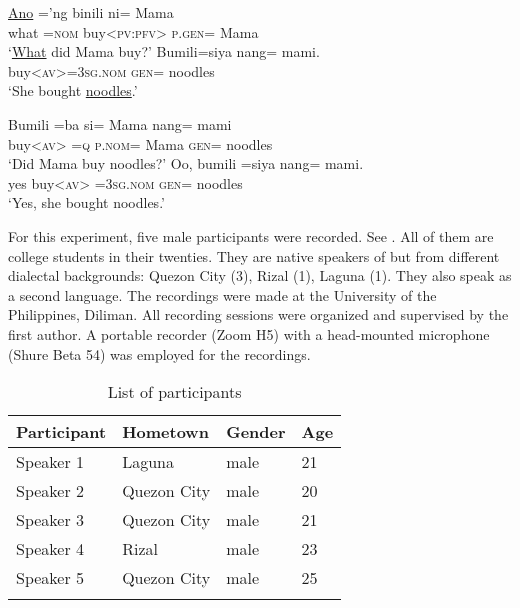 \documentclass[output=paper]{langsci/langscibook}
\begin{document}
\begin{exe}
	\ex\label{e:nagaya:13}
	\begin{xlist}
		\gll \uline{Ano}  =’ng  {\ob}b{\USSmaller}in{\USGreater}ili    ni=    Mama{\cb}{\USQMark}\\
		what  =\textsc{nom}  \phantom{[}buy<\textsc{pv:pfv}>  \textsc{p.gen}=  Mama\\
		\glt ‘\uline{What} did Mama buy?’
		\gll B{\USSmaller}um{\USGreater}ili=siya  nang=  mami\llap{\uline{\phantom{nang=  mami}}}.\\
		buy<\textsc{av}>=\textsc{3sg.nom}  \textsc{gen}=  noodles\\
		\glt ‘She bought \uline{noodles}.’
	\end{xlist}
\end{exe}

\begin{exe}
	\ex\label{e:nagaya:14}
	\begin{xlist}
		\exi{Q:}  
		\gll B{\USSmaller}um{\USGreater}ili  =ba  si=    Mama  nang=  mami{\USQMark}\\
		buy<\textsc{av}>  \textsc{=q}  \textsc{p.nom}=  Mama  \textsc{gen}=  noodles\\
		\glt ‘Did Mama buy noodles?’
		\exi{A:}
		\gll Oo,  b{\USSmaller}um{\USGreater}ili  =siya    nang=  mami.\\
		yes  buy<\textsc{av}>  =\textsc{3sg.nom}  \textsc{gen}=  noodles\\
		\glt ‘Yes, she bought noodles.’
	\end{xlist}
\end{exe}

\noindent
For this experiment, five male participants were recorded. See . All of them are college students in their twenties. They are native speakers of  but from different dialectal backgrounds: Quezon City (3), Rizal (1), Laguna (1). They also speak  as a second language. The recordings were made at the University of the Philippines, Diliman. All recording sessions were organized and supervised by the first author. A portable recorder (Zoom H5) with a head-mounted microphone (Shure Beta 54) was employed for the recordings. 

\begin{table}
\begin{tabularx}{\textwidth}{XXXl}
	\lsptoprule
	Participant & Hometown & Gender & Age\\
	\midrule 
	{Speaker 1} & {Laguna} & {male} & {21}\\
	\tablevspace
	Speaker 2 & Quezon City & male & 20\\
	\tablevspace
	{Speaker 3} & {Quezon City} & {male} & {21}\\
	\tablevspace
	Speaker 4 & Rizal & male & 23\\
	\tablevspace
	{Speaker 5} & {Quezon City} & {male} & {25}\\
	\lspbottomrule
\end{tabularx}
	\caption{List of participants}
	\label{tab:nagaya:2}
\end{table}
\end{document}
